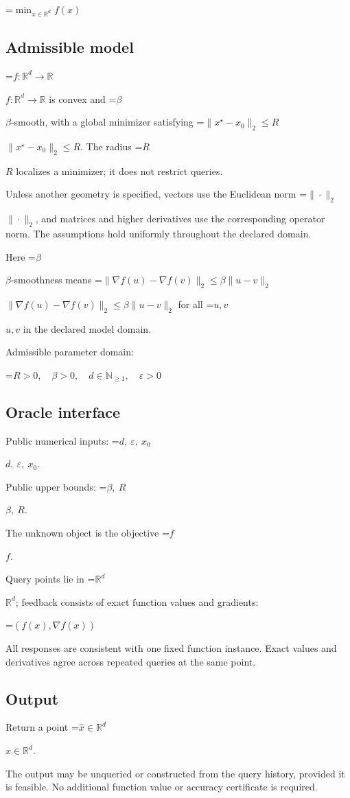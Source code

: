 \documentclass[10pt,a4paper]{article}
\newcommand{\AtlasMath}[1]{\par\begingroup\centering\setbox0=\hbox{$\displaystyle #1$}\ifdim\wd0>1.4\linewidth\typeout{ATLAS WIDE FORMULA: \the\wd0}\fi\ifdim\wd0>\linewidth\resizebox{\linewidth}{!}{\box0}\else\box0\fi\par\endgroup}
\newcommand{\AtlasInlineMath}[1]{\begingroup\setbox0=\hbox{$#1$}\ifdim\wd0>.4\linewidth\endgroup\AtlasMath{#1}\else\endgroup$#1$\fi}
\begin{document}
\AtlasMath{\min_{x\in \mathbb{R}^d}f(x)}


\subsection{Admissible model}
\AtlasInlineMath{f:\mathbb R^d\to\mathbb R} is convex and \AtlasInlineMath{\beta}-smooth, with a global minimizer satisfying \AtlasInlineMath{\|x^\star-x_0\|_2\le R}. The radius \AtlasInlineMath{R} localizes a minimizer; it does not restrict queries.

Unless another geometry is specified, vectors use the Euclidean norm \AtlasInlineMath{\|\cdot\|_2}, and matrices and higher derivatives use the corresponding operator norm. The assumptions hold uniformly throughout the declared domain.

Here \AtlasInlineMath{\beta}-smoothness means \AtlasInlineMath{\|\nabla f(u)-\nabla f(v)\|_2\le\beta\|u-v\|_2} for all \AtlasInlineMath{u,v} in the declared model domain.

Admissible parameter domain:


\AtlasMath{R>0,\quad \beta>0,\quad d\in\mathbb{N}_{\ge1},\quad \varepsilon>0}


\subsection{Oracle interface}
Public numerical inputs: \AtlasInlineMath{d,\ \varepsilon,\ x_0}.

Public upper bounds: \AtlasInlineMath{\beta,\ R}.

The unknown object is the objective \AtlasInlineMath{f}.

Query points lie in \AtlasInlineMath{\mathbb{R}^d}; feedback consists of exact function values and gradients:


\AtlasMath{(f(x),\nabla f(x))}


All responses are consistent with one fixed function instance. Exact values and derivatives agree across repeated queries at the same point.

\subsection{Output}
Return a point \AtlasInlineMath{\widehat x\in\mathbb R^d}.

The output may be unqueried or constructed from the query history, provided it is feasible. No additional function value or accuracy certificate is required.
\end{document}
